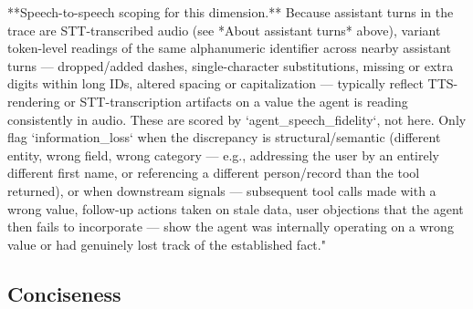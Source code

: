 \begin{tcolorbox}[promptbox, title={\small \texttt{information\_loss\_pipeline\_note} (S2S)}]
**Speech-to-speech scoping for this dimension.** Because assistant turns in the trace are STT-transcribed audio (see *About assistant turns* above), variant token-level readings of the same alphanumeric identifier across nearby assistant turns — dropped/added dashes, single-character substitutions, missing or extra digits within long IDs, altered spacing or capitalization — typically reflect TTS-rendering or STT-transcription artifacts on a value the agent is reading consistently in audio. These are scored by `agent\_speech\_fidelity`, not here. Only flag `information\_loss` when the discrepancy is structural/semantic (different entity, wrong field, wrong category — e.g., addressing the user by an entirely different first name, or referencing a different person/record than the tool returned), or when downstream signals — subsequent tool calls made with a wrong value, follow-up actions taken on stale data, user objections that the agent then fails to incorporate — show the agent was internally operating on a wrong value or had genuinely lost track of the established fact."
\end{tcolorbox}

\subsection{Conciseness}
\label{app:prompt-conciseness}

